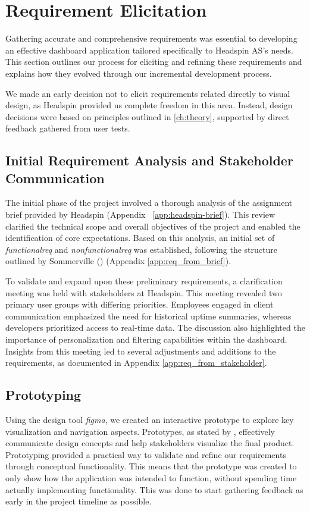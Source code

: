 \section{Requirement Elicitation}
\label{sec:req_gathering}
Gathering accurate and comprehensive requirements was essential to developing an effective dashboard application tailored specifically to Headspin AS’s needs. This section outlines our process for eliciting and refining these requirements and explains how they evolved through our incremental development process.

We made an early decision not to elicit requirements related directly to visual design, as Headspin provided us complete freedom in this area. Instead, design decisions were based on principles outlined in \autoref{ch:theory}, supported by direct feedback gathered from user tests.


\subsection{Initial Requirement Analysis and Stakeholder Communication}
\label{subsec:init_req_analysis}
The initial phase of the project involved a thorough analysis of the assignment brief provided by Headspin (Appendix ~\ref{app:headspin-brief}). This review clarified the technical scope and overall objectives of the project and enabled the identification of core expectations. Based on this analysis, an initial set of \textit{\gls{functionalreq}} and \textit{\gls{nonfunctionalreq}} was established, following the structure outlined by Sommerville (\cite[84–91]{sommerville-2011}) (Appendix \ref{app:req_from_brief}).

To validate and expand upon these preliminary requirements, a clarification meeting was held with stakeholders at Headspin. This meeting revealed two primary user groups with differing priorities. Employees engaged in client communication emphasized the need for historical uptime summaries, whereas developers prioritized access to real-time data. The discussion also highlighted the importance of personalization and filtering capabilities within the dashboard. Insights from this meeting led to several adjustments and additions to the requirements, as documented in Appendix \ref{app:req_from_stakeholder}.


\subsection{Prototyping}
\label{subsec:prototyping}
Using the design tool \textit{\gls{figma}}, we created an interactive \gls{prototype} to explore key visualization and navigation aspects. Prototypes, as stated by \textcite[ 423]{sharp-2019}, effectively communicate design concepts and help stakeholders visualize the final product. Prototyping provided a practical way to validate and refine our requirements through conceptual functionality. This means that the prototype was created to only show how the application was intended to function, without spending time actually implementing functionality. This was done to start gathering feedback as early in the project timeline as possible. 

